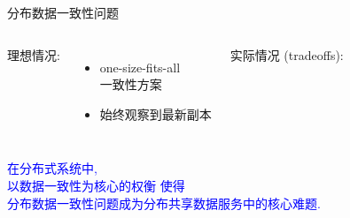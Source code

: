 \begin{frame}{分布数据一致性问题}
  \begin{columns}[t]
	  理想情况:
	  \begin{itemize}
		\item one-size-fits-all\\一致性方案
		\item 始终观察到最新副本
	  \end{itemize}
    \pause
	实际情况 (tradeoffs):
  \end{columns}
  \pause
  \vspace{0.50cm}
  \begin{center}
	\textcolor{blue}{在分布式系统中, \\以数据一致性为核心的权衡  使得 \\
  		分布数据一致性问题成为分布共享数据服务中的核心难题.}
  \end{center}
\end{frame}
%       
